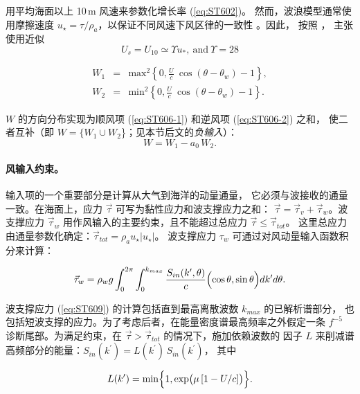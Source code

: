 \citet{art:Dea06} 用平均海面以上 10\,m 风速来参数化增长率 (\ref{eq:ST602})。
然而，波浪模型通常使用摩擦速度 $u_\star=\tau/\rho_a$，以保证不同风速下风区律的一致性
\citep[][p. 253]{bk:WAM94}。因此，\citet{art:RBW12} 按照 \citet{art:KHH84}，
主张使用近似
\begin{equation}
U_s = U_{10} \simeq \Upsilon u_{\ast},\ \mathrm{and}\ \Upsilon = 28
\label{eq:Upsilon}
\end{equation}

\begin{eqnarray}
W_1 & = & \mathrm{max}^2 \left \{ 0,\frac{U}{c}\ \cos(\theta-\theta_w)-1
\right \}  , \label{eq:ST606-1} \\
W_2 & = & \mathrm{min}^2 \left \{ 0,\frac{U}{c}\ \cos(\theta-\theta_w)-1
\right \} .\label{eq:ST606-2}
\end{eqnarray}

\noindent
$W$ 的方向分布实现为顺风项 (\ref{eq:ST606-1}) 和逆风项 (\ref{eq:ST606-2}) 之和，
使二者互补（即 $W=\{W_1\cup W_2$\}；见本节后文的{\it 负输入}）：
\begin{equation}\label{eq:ST606}
W=W_1-a_0\,W_2  .
\end{equation}

\paragraph{风输入约束。} 输入项的一个重要部分是计算从大气到海洋的动量通量，
它必须与波接收的通量一致。在海面上，应力 $\vec{\tau}$ 可写为黏性应力和波支撑应力之和：
$\vec{\tau} = \vec{\tau}_{v} + \vec{\tau}_{w}$。波支撑应力 $ \vec{\tau}_{w}$
用作风输入的主要约束，且不能超过总应力 $\vec{\tau} \le \vec{\tau}_{tot}$。
这里总应力由通量参数化确定：$\vec{\tau}_{tot}=\rho_a u_\star|u_\star|$。
波支撑应力 $\tau_w$ 可通过对风动量输入函数积分来计算：

\begin{equation}\label{eq:ST609}
   \vec{\tau}_w = \rho_w g \int_{0}^{2\pi} \int_{0}^{k_{max}}
   \frac{S_{in}(k^\prime,\theta)}{c} \Bigl (\cos\theta,\sin\theta \Bigr )
   dk^\prime d\theta  .
\end{equation}

\noindent
波支撑应力 (\ref{eq:ST609}) 的计算包括直到最高离散波数 $k_{max}$ 的已解析谱部分，
也包括短波支撑的应力。为了考虑后者，在能量密度谱最高频率之外假定一条 $f^{-5}$
诊断尾部。为满足约束，在 $\vec{\tau} > \vec{\tau}_{tot}$ 的情况下，施加依赖波数的
因子 $L$ 来削减谱高频部分的能量：$S_{in}(k^\prime)=L(k^\prime)\,S_{in}(k^\prime)$，
其中

\begin{equation}\label{eq:ST610}
L(k^\prime) = \min \Bigl \{ 1, \exp \bigl ( \mu\,[1- U/c] \bigr ) \Bigr
\}  .
\end{equation}

